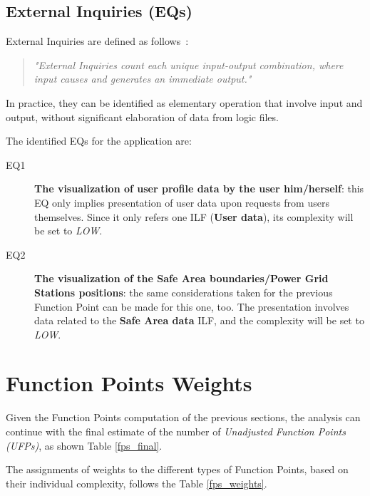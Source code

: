 \subsection{External Inquiries (EQs)}
External Inquiries are defined as follows~\cite{cocomo-manual}:
\begin{quotation}
\textit{"External Inquiries count each unique input-output combination, where input causes and generates an immediate output."}
\end{quotation}
In practice, they can be identified as elementary operation that involve input and output, without significant elaboration of data from logic files.

The identified EQs for the application are:
\begin{description}
\item[EQ1] \textbf{The visualization of user profile data by the user him/herself}: this EQ only implies presentation of user data upon requests from users themselves. Since it only refers one ILF (\textbf{User data}), its complexity will be set to \textit{LOW}.
\item[EQ2] \textbf{The visualization of the Safe Area boundaries/Power Grid Stations positions}: the same considerations taken for the previous Function Point can be made for this one, too. The presentation involves data related to the \textbf{Safe Area data} ILF, and the complexity will be set to \textit{LOW}.
\end{description}

\section{Function Points Weights}
Given the Function Points computation of the previous sections, the analysis can continue with the final estimate of the number of \textit{Unadjusted Function Points (UFPs)}, as shown Table \ref{fps_final}.

The assignments of weights to the different types of Function Points, based on their individual complexity, follows the Table \ref{fps_weights}.

